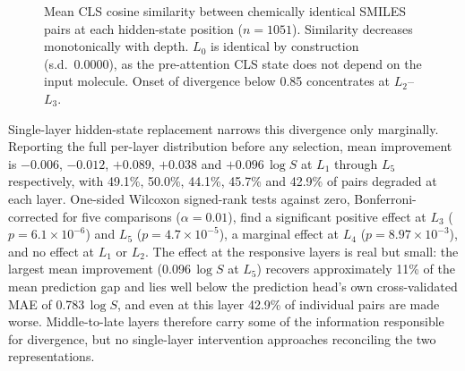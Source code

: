 \documentclass[twoside,twocolumn,9pt]{article}
\newcommand{\logS}{\ensuremath{\log S}}
\begin{document}
\begin{figure}[h]
\centering
{}
\caption{Mean CLS cosine similarity between chemically identical SMILES pairs at each hidden-state position ($n=1051$). Similarity decreases monotonically with depth. $L_0$ is identical by construction (s.d.\ 0.0000), as the pre-attention CLS state does not depend on the input molecule. Onset of divergence below 0.85 concentrates at $L_2$--$L_3$.}
\label{fig:layers}
\end{figure}

Single-layer hidden-state replacement narrows this divergence only marginally. Reporting the full per-layer distribution before any selection, mean improvement is $-0.006$, $-0.012$, $+0.089$, $+0.038$ and $+0.096$\,$\logS$ at $L_1$ through $L_5$ respectively, with 49.1\%, 50.0\%, 44.1\%, 45.7\% and 42.9\% of pairs degraded at each layer. One-sided Wilcoxon signed-rank tests against zero, Bonferroni-corrected for five comparisons ($\alpha=0.01$), find a significant positive effect at $L_3$ ($p=6.1\!\times\!10^{-6}$) and $L_5$ ($p=4.7\!\times\!10^{-5}$), a marginal effect at $L_4$ ($p=8.97\!\times\!10^{-3}$), and no effect at $L_1$ or $L_2$. The effect at the responsive layers is real but small: the largest mean improvement (0.096\,$\logS$ at $L_5$) recovers approximately 11\% of the mean prediction gap and lies well below the prediction head's own cross-validated MAE of 0.783\,$\logS$, and even at this layer 42.9\% of individual pairs are made worse. Middle-to-late layers therefore carry some of the information responsible for divergence, but no single-layer intervention approaches reconciling the two representations.
\end{document}
